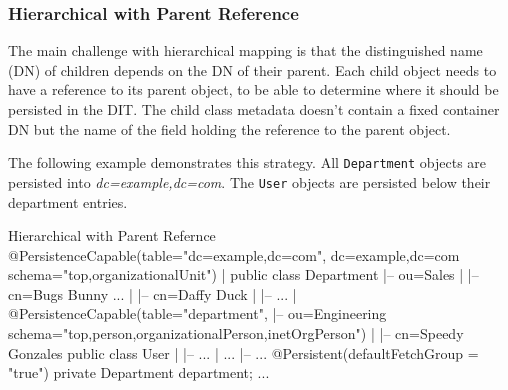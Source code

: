 \documentclass[a4paper,11pt,oneside]{article}
\begin{document}
\subsubsection{Hierarchical with Parent Reference}
The main challenge with hierarchical mapping is that the distinguished name (DN) of children depends on the DN of their parent. Each child object needs to have a reference to its parent object, to be able to determine where it should be persisted in the DIT. The child class metadata doesn't contain a fixed container DN but the name of the field holding the reference to the parent object.

The following example demonstrates this strategy. All \texttt{Department} objects are persisted into \textit{dc=example,dc=com}. The \texttt{User} objects are persisted below their department entries.

\begin{SaveVerbatim}{Hierarchical with Parent Refernce}
@PersistenceCapable(table="dc=example,dc=com",                  dc=example,dc=com               
    schema="top,organizationalUnit")                            |                               
public class Department                                         |-- ou=Sales                    
{                                                               |   |-- cn=Bugs Bunny           
    ...                                                         |   |-- cn=Daffy Duck           
}                                                               |   |-- ...                     
                                                                |                               
@PersistenceCapable(table="{department}",                       |-- ou=Engineering              
    schema="top,person,organizationalPerson,inetOrgPerson")     |   |-- cn=Speedy Gonzales      
public class User                                               |   |-- ...                     
{                                                               |
    ...                                                         |-- ...                       
    @Persistent(defaultFetchGroup = "true")                 
    private Department department;                                         
    ...                                                              
} 
\end{SaveVerbatim}
\begin{figure}[htb]
\end{figure}
\end{document}

